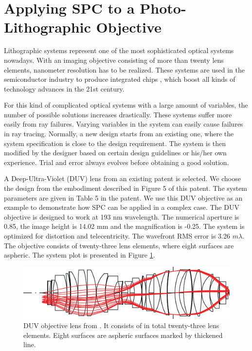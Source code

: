 \section{Applying SPC to a Photo-Lithographic Objective}
Lithographic systems represent one of the most sophisticated optical systems nowadays. With an imaging objective consisting of more than twenty lens elements, nanometer resolution has to be realized. These systems are used in the semiconductor industry to produce integrated chips \cite{Matsuyama2006_LithoHis}, which boost all kinds of technology advances in the 21st century. 

For this kind of complicated optical systems with a large amount of variables, the number of possible solutions increases drastically. These systems suffer more easily from ray failures. Varying variables in the system can easily cause failures in ray tracing. Normally, a new design starts from an existing one, where the system specification is close to the design requirement. The system is then modified by the designer based on certain design guidelines \cite{LivshitsQA2013}\cite{Shafer1995_moreless}\cite{Cao2017_GroupDesign} or his/her own experience. Trial and error always evolves before obtaining a good solution. 

A Deep-Ultra-Violet (DUV) lens from an existing patent \cite{patentZeissDUV} is selected. We choose the design from the embodiment described in Figure 5 of this patent. The system parameters are given in Table 5 in the patent. We use this DUV objective as an example to demonstrate how SPC can be applied in a complex case. The DUV objective is designed to work at 193 nm wavelength. The numerical aperture is 0.85, the image height is 14.02 mm and the magnification is -0.25. The system is optimized for distortion and telecentricity. The wavefront RMS error is 3.26 $m\lambda$. The objective consists of twenty-three lens elements, where eight surfaces are aspheric. The system plot is presented in Figure \ref{fig: litho_DUV_plot}. 
\begin{figure}[h!]
    \centering
    \includegraphics[width=\textwidth]{chapter-4/figures/Litho_DUV_plot.png}
    \caption{DUV objective lens from \cite{patentZeissDUV}. It consists of in total twenty-three lens elements. Eight surfaces are aspheric surfaces marked by thickened line.}
    \label{fig: litho_DUV_plot}
\end{figure}

